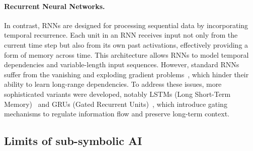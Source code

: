 \paragraph{Recurrent Neural Networks.}
%
In contrast, \glspl{RNN} are designed for processing sequential data by incorporating temporal recurrence.
%
Each unit in an \gls{RNN} receives input not only from the current time step but also from its own past activations, effectively providing a form of memory across time.
%
This architecture allows \glspl{RNN} to model temporal dependencies and variable-length input sequences.
%
However, standard \glspl{RNN} suffer from the vanishing and exploding gradient problems~\cite{bengio1994learning}, which hinder their ability to learn long-range dependencies.
%
To address these issues, more sophisticated variants were developed, notably \glspl{LSTM} (Long Short-Term Memory)~\cite{hochreiter1997long} and \glspl{GRU} (Gated Recurrent Units)~\cite{cho2014learning}, which introduce gating mechanisms to regulate information flow and preserve long-term context.


\subsection{Limits of sub-symbolic \Gls{AI}}\label{subsec:limits-of-sub-symbolic-ai}